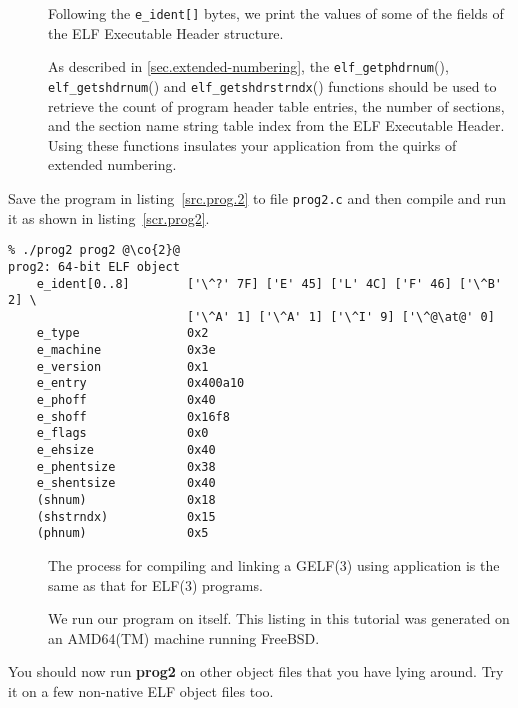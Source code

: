 \documentclass[a4paper]{report}
\makeatletter
\newcommand{\function}[1]{\texttt{#1}()}
\newcommand{\filename}[1]{\texttt{#1}}
\newcommand{\parameter}[1]{\texttt{#1}}
\newcommand{\tool}[1]{\textbf{#1}}
\newcommand{\trade}{(TM)\xspace}
\newenvironment{callout}[2][blue]{%
  \begingroup\newcommand{\@cocolor}{#1}%
  \newcommand{\@cogroup}[1]{#2}}{\endgroup}
\newcommand{\@co}[1]{\framebox{\textbf{\color{\@cocolor}#1}}}
\newcommand{\co}[1]{%
  \hypertarget{\@cogroup.#1.co}{%
    \hyperlink{\@cogroup.#1.cr}{\@co{#1}}}}
\newcommand{\coref}[1]{%
  \hypertarget{\@cogroup.#1.cr}{%
    \hyperlink{\@cogroup.#1.co}{\@co{#1}}}}
\makeatother
\begin{document}
\begin{callout}{prog2}
\begin{description}
  \item[\coref{6}] Following the \parameter{e\_ident[]} bytes, we
    print the values of some of the fields of the ELF Executable
    Header structure.

  \item[\coref{7} \coref{8} \coref{9}] As described in \vref{sec.extended-numbering}, the
    \function{elf\_getphdrnum}, \function{elf\_getshdrnum} and
    \function{elf\_getshdrstrndx} functions should be used to retrieve
    the count of program header table entries, the number of sections,
    and the section name string table index from the ELF Executable
    Header.  Using these functions insulates your application from the
    quirks of extended numbering.
  \end{description}
\end{callout}

Save the program in listing~\vref{src.prog.2} to file \filename{prog2.c} and
then compile and run it as shown in listing~\vref{scr.prog2}.

\begin{callout}[red]{scr2}
  \newcommand{\at}{@}
  \begin{lstlisting}[language={}, basicstyle=\small\ttfamily,
      label=scr.prog2, caption=Compiling and Running prog2]
% cc -o prog2 prog2.c -lelf @\co{1}@
% ./prog2 prog2 @\co{2}@
prog2: 64-bit ELF object
    e_ident[0..8]        ['\^?' 7F] ['E' 45] ['L' 4C] ['F' 46] ['\^B' 2] \
                         ['\^A' 1] ['\^A' 1] ['\^I' 9] ['\^@\at@' 0]
    e_type               0x2
    e_machine            0x3e
    e_version            0x1
    e_entry              0x400a10
    e_phoff              0x40
    e_shoff              0x16f8
    e_flags              0x0
    e_ehsize             0x40
    e_phentsize          0x38
    e_shentsize          0x40
    (shnum)              0x18
    (shstrndx)           0x15
    (phnum)              0x5
  \end{lstlisting}
  \begin{description}
  \item[\coref{1}] The process for compiling and linking a GELF(3)
    using application is the same as that for ELF(3) programs.

  \item[\coref{2}] We run our program on itself.  This listing in this
    tutorial was generated on an AMD64\trade machine running FreeBSD.
  \end{description}

  You should now run \tool{prog2} on other object files that you have
  lying around.  Try it on a few non-native ELF object files too.
\end{callout}
\end{document}
